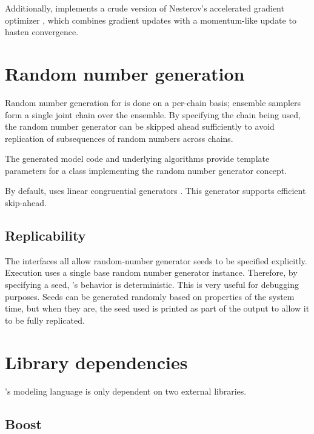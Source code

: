 \documentclass[article]{jss}
\begin{document}
Additionally,  implements a crude version of Nesterov's
accelerated gradient optimizer \cite{Nesterov:1983}, which combines
gradient updates with a momentum-like update to hasten convergence.

\section{Random number generation}\label{rng.section}

Random number generation for  is done on a per-chain
basis; ensemble samplers form a single joint chain over the ensemble.  By
specifying the chain being used, the random number generator can be
skipped ahead sufficiently to avoid replication of subsequences of
random numbers across chains.

The generated model code and underlying  algorithms
provide template parameters for a class implementing the 
random number generator concept.  

By default,  uses linear congruential generators
\citep{LEcuyer:1988}.  This generator supports efficient skip-ahead.

\subsection{Replicability}

The  interfaces all allow random-number generator seeds
to be specified explicitly.  Execution uses a single base random
number generator instance.  Therefore, by specifying a seed,
's behavior is deterministic.  This is very useful for
debugging purposes.  Seeds can be generated randomly based on
properties of the system time, but when they are, the seed used is
printed as part of the output to allow it to be fully replicated.


\section{Library dependencies}

's modeling language is only dependent on two external
libraries.  

\subsection{Boost} 
\end{document}
